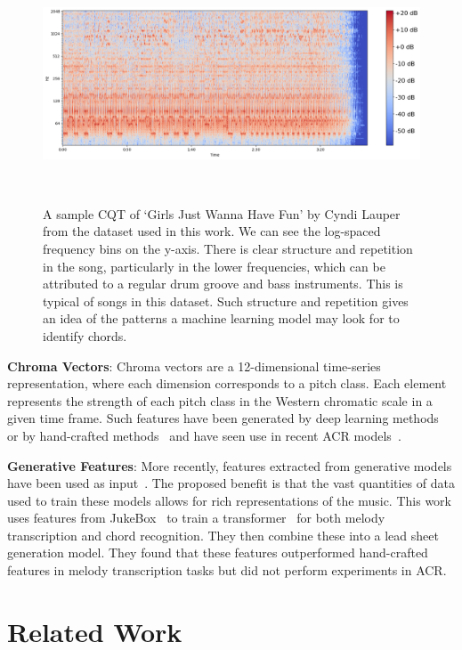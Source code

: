 \begin{figure}[H]
    \centering
    \includegraphics[width=1\textwidth]{figures/sample_cqt.png}
    \caption{A sample CQT of `Girls Just Wanna Have Fun' by Cyndi Lauper from the dataset used in this work. We can see the log-spaced frequency bins on the y-axis. There is clear structure and repetition in the song, particularly in the lower frequencies, which can be attributed to a regular drum groove and bass instruments. This is typical of songs in this dataset. Such structure and repetition gives an idea of the patterns a machine learning model may look for to identify chords.}~\label{fig:cqt_example}
\end{figure}

\textbf{Chroma Vectors}: Chroma vectors are a 12-dimensional time-series representation, where each dimension corresponds to a pitch class. Each element represents the strength of each pitch class in the Western chromatic scale in a given time frame. Such features have been generated by deep learning methods~\citep{BalanceRandomForestACR} or by hand-crafted methods~\citep{NNLSChroma} and have seen use in recent ACR models~\citep{HarmonyTransformer}.

\textbf{Generative Features}: More recently, features extracted from generative models have been used as input~\citep{MelodyTranscriptionViaGenerativePreTraining}. The proposed benefit is that the vast quantities of data used to train these models allows for rich representations of the music. This work uses features from JukeBox~\citep{Jukebox} to train a transformer~\citep{AttentionIsAllYouNeed} for both melody transcription and chord recognition. They then combine these into a lead sheet generation model. They found that these features outperformed hand-crafted features in melody transcription tasks but did not perform experiments in ACR.

\section{Related Work}

